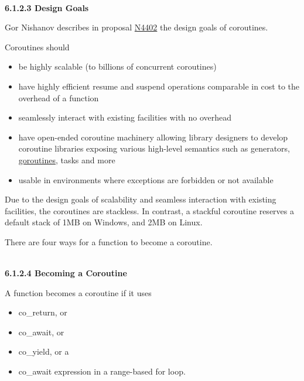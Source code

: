 \hspace*{\fill} \\ %
\noindent
\textbf{6.1.2.3\hspace{0.2cm} Design Goals}

Gor Nishanov describes in proposal \href{https://isocpp.org/files/papers/N4402.pdf}{N4402} the design goals of coroutines.

Coroutines should

\begin{itemize}
\item 
be highly scalable (to billions of concurrent coroutines)

\item 
have highly efficient resume and suspend operations comparable in cost to the overhead of a function

\item 
seamlessly interact with existing facilities with no overhead

\item 
have open-ended coroutine machinery allowing library designers to develop coroutine libraries exposing various high-level semantics such as generators, \href{https://tour.golang.org/concurrency/1}{goroutines}, tasks and more

\item 
usable in environments where exceptions are forbidden or not available
\end{itemize}

Due to the design goals of scalability and seamless interaction with existing facilities, the coroutines are stackless. In contrast, a stackful coroutine reserves a default stack of 1MB on Windows, and 2MB on Linux.

There are four ways for a function to become a coroutine.

\hspace*{\fill} \\ %
\noindent
\textbf{6.1.2.4\hspace{0.2cm} Becoming a Coroutine}

A function becomes a coroutine if it uses

\begin{itemize}
\item 
co\_return, or

\item 
co\_await, or

\item 
co\_yield, or a

\item 
co\_await expression in a range-based for loop.
\end{itemize}

